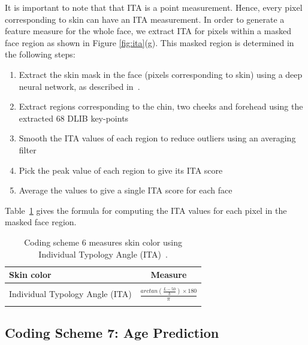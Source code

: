 \documentclass[letterpaper,11pt]{article}
\begin{document}
It is important to note that that ITA is a point measurement. Hence, every pixel corresponding to skin can have an ITA measurement.  In order to generate a feature measure for the whole face, we extract ITA for pixels within a masked face region as shown in Figure \ref{fig:ita}(g).  This masked region is determined in the following steps:
\begin{enumerate}
    \item Extract the skin mask in the face (pixels corresponding to skin) using a deep neural network, as described in~\cite{noel_skin_segmentation}.
    \item Extract regions corresponding to the chin, two cheeks and forehead using the extracted 68 DLIB key-points
    \item Smooth the ITA values of each region to reduce outliers using an averaging filter
    \item Pick the peak value of each region to give its ITA score
    \item Average the values to give a single ITA score for each face
\end{enumerate}
Table~\ref{tab:skincolor} gives the formula for computing the ITA values for each pixel in the masked face region.
\begin{table}[ht]
\centering
\begin{tabular}{|l|c|}
    \hline 
    \bf Skin color    & \bf Measure\\\hline\hline
    & \\
    Individual Typology Angle (ITA)& $\frac{arctan(\frac{L-50}{b}) \times 180}{\pi}$ \\
    & \\ \hline
\end{tabular}
    \caption{Coding scheme 6 measures skin color using Individual Typology Angle (ITA)~\cite{anthropmetry05}.}
    \label{tab:skincolor}
\end{table}

\subsection{Coding Scheme 7: Age Prediction}\label{sec:age}
\end{document}
